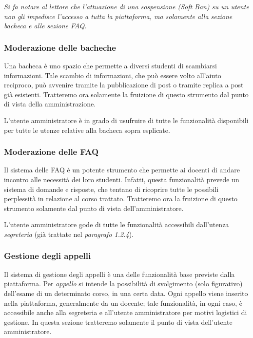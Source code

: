 \documentclass [a4paper,11pt]{book}
\begin{document}
\medskip

\emph{Si fa notare al lettore che l'attuazione di una sospensione (\emph{Soft Ban}) su un utente non gli impedisce l'accesso a tutta la piattaforma, ma solamente alla sezione bacheca e alle sezione FAQ.}

\medskip

\subsubsection{Moderazione delle bacheche}

Una bacheca è uno spazio che permette a diversi studenti di scambiarsi informazioni. Tale scambio di informazioni, che può essere volto all'aiuto reciproco, può avvenire tramite la pubblicazione di post o tramite replica a post già esistenti. Tratteremo ora solamente la fruizione di questo strumento dal punto di vista della amministrazione.

L'utente amministratore è in grado di usufruire di tutte le funzionalità disponibili per tutte le utenze relative alla bacheca sopra esplicate.

\medskip

\subsubsection{Moderazione delle FAQ}

Il sistema delle FAQ è un potente strumento che permette ai docenti di andare incontro alle necessità dei loro studenti. Infatti, questa funzionalità prevede un sistema di domande e risposte, che tentano di ricoprire tutte le possibili perplessità in relazione al corso trattato. Tratteremo ora la fruizione di questo strumento solamente dal punto di vista dell'amministratore.

L'utente amministratore gode di tutte le funzionalità accessibili dall'utenza \emph{segreteria} (già trattate nel \emph{paragrafo 1.2.4}).

\medskip

\subsubsection{Gestione degli appelli}

Il sistema di gestione degli appelli è una delle funzionalità base previste dalla piattaforma. Per \emph{appello} si intende la possibilità di svolgimento (solo figurativo) dell'esame di un determinato corso, in una certa data. Ogni appello viene inserito nella piattaforma, generalmente da un docente; tale funzionalità, in ogni caso, è accessibile anche alla segreteria e all'utente amministratore per motivi logistici di gestione. In questa sezione tratteremo solamente il punto di vista dell'utente amministratore.
\end{document}
